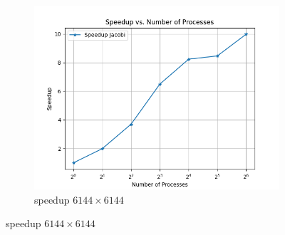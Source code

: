 \documentclass{article}
\newcommand{\eng}[1]{#1}
\begin{document}
\begin{figure}[ht]
    \begin{subfigure}{0.6\textwidth}
        \includegraphics[width=\textwidth]{a5/plots/speedup-jacobi-large.png}
        \caption{\eng{speedup} $6144 \times 6144$}
        \label{fig:jacobi6144speedup}
    \end{subfigure}
\end{figure}
\FloatBarrier
\end{document}
